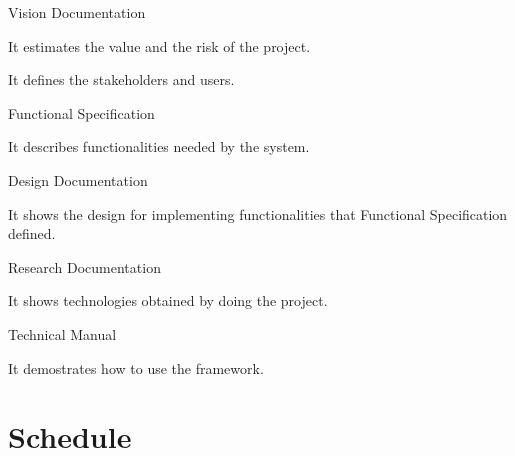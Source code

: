 \begin{DoxyItemize}
\item Vision Documentation
\begin{DoxyItemize}
\item It estimates the value and the risk of the project.
\item It defines the stakeholders and users.
\end{DoxyItemize}
\item Functional Specification
\begin{DoxyItemize}
\item It describes functionalities needed by the system.
\end{DoxyItemize}
\item Design Documentation
\begin{DoxyItemize}
\item It shows the design for implementing functionalities that Functional Specification defined.
\end{DoxyItemize}
\item Research Documentation
\begin{DoxyItemize}
\item It shows technologies obtained by doing the project.
\end{DoxyItemize}
\item Technical Manual
\begin{DoxyItemize}
\item It demostrates how to use the framework.
\end{DoxyItemize}
\end{DoxyItemize}\hypertarget{_project_plan_ProjectPlanSchedule}{}\section{Schedule}\label{_project_plan_ProjectPlanSchedule}

